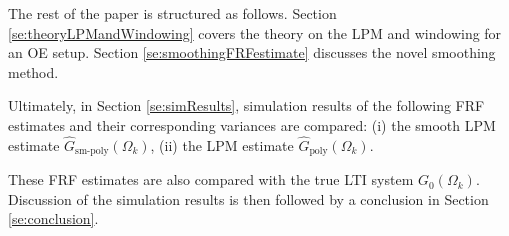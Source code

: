 The rest of the paper is structured as follows. Section \ref{se:theoryLPMandWindowing} covers the theory on the LPM and windowing for an OE setup. 
Section \ref{se:smoothingFRFestimate} discusses the novel smoothing method. 

Ultimately, in Section \ref{se:simResults}, simulation results of the following FRF estimates and their corresponding variances are compared: (i) the smooth LPM estimate $\hat{G}_\text{sm-poly}(\Omega_k)$, (ii) the LPM estimate $\hat{G}_\text{poly}(\Omega_k)$. 

These FRF estimates are also compared with the true LTI system ${G}_0(\Omega_k)$. Discussion of the simulation results is then followed by a conclusion in Section \ref{se:conclusion}.

